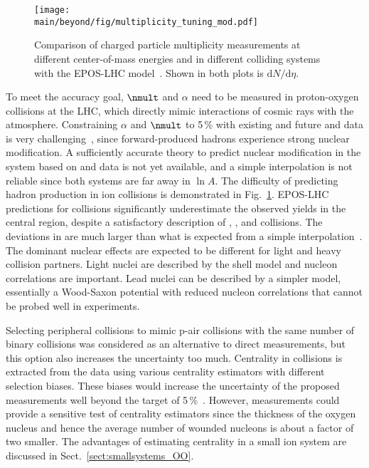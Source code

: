\documentclass[../report.tex]{subfiles}
\providecommand{\main}{..}
\begin{document}
\begin{figure}
\texttt{[image: \\main/beyond/fig/multiplicity\_tuning\_mod.pdf]}
\caption{Comparison of charged particle multiplicity measurements at different center-of-mass energies and in different colliding systems with the EPOS-LHC model~\cite{Kim:2018ink}. Shown in both plots is $\text{d} N/\text{d}\eta$.}
\label{fig:multiplicity_tuning}
\end{figure}

To meet the accuracy goal, $\nmult$ and $\alpha$ need to be measured in proton-oxygen collisions at the LHC, which directly mimic interactions of cosmic rays with the atmosphere. Constraining $\alpha$ and $\nmult$ to 5\,\% with existing and future \pp and \pPb data is very challenging~\cite{dEnterria:2018kcz}, since forward-produced hadrons experience strong nuclear modification\cite{Aaij:2017cqq,Acharya:2018qsh,Adriani:2015iwv}. A sufficiently accurate theory to predict nuclear modification in the \pO system based on \pp and \pPb data is not yet available, and a simple interpolation is not reliable since both systems are far away in $\ln A$.
The difficulty of predicting hadron production in ion collisions is demonstrated in Fig.~\ref{fig:multiplicity_tuning}. EPOS-LHC predictions for \XeXe collisions significantly underestimate the observed yields in the central region, despite a satisfactory description of \pp, \pPb, and \PbPb collisions. The deviations in \XeXe are much larger than what is expected from a simple interpolation~\cite{Kim:2018ink}. The dominant nuclear effects are expected to be different for light and heavy collision partners. Light nuclei are described by the shell model and nucleon correlations are important. Lead nuclei can be described by a simpler model, essentially a Wood-Saxon potential with reduced nucleon correlations that cannot be probed well in experiments.

Selecting peripheral \pPb collisions to mimic p-air collisions with the same number of binary collisions was considered as an alternative to direct \pO measurements, but this option also increases the uncertainty too much. Centrality in \pPb collisions is extracted from the data using various centrality estimators with different selection biases. These biases would increase the uncertainty of the proposed measurements well beyond the target of 5\,\%~\cite{Adam:2014qja}. However, \pO measurements could provide a sensitive test of centrality estimators since the thickness of the oxygen nucleus and hence the average number of wounded nucleons is about a factor of two smaller. The advantages of estimating centrality in a small ion system are discussed in Sect.~\ref{sect:smallsystems_OO}.
\end{document}
